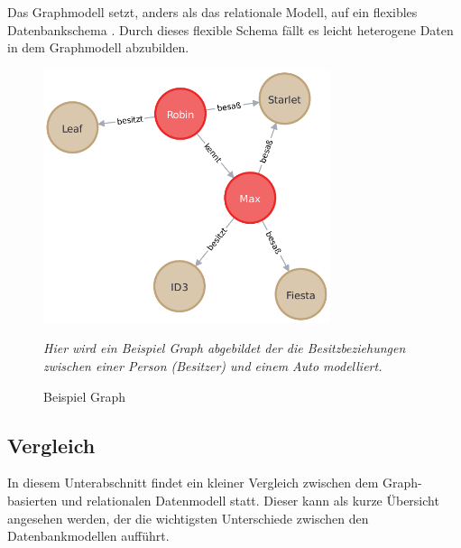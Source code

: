 Das Graphmodell setzt, anders als das relationale Modell, auf ein flexibles Datenbankschema \cite{gdbms}. Durch dieses flexible Schema fällt es leicht heterogene Daten in dem Graphmodell abzubilden. 

\begin{figure}[ht]
    \centering
    \includegraphics[width=0.75\textwidth]{images/example_graph.pdf}
    \caption{Beispiel Graph}
    \vspace{1em}
    \textit{Hier wird ein Beispiel Graph abgebildet der die Besitzbeziehungen zwischen einer Person (Besitzer) und einem Auto modelliert.}
    \label{fig:beispiel_graph}
\end{figure}

\subsection{Vergleich}
In diesem Unterabschnitt findet ein kleiner Vergleich zwischen dem Graph-basierten und relationalen Datenmodell statt. Dieser kann als kurze Übersicht angesehen werden, der die wichtigsten Unterschiede zwischen den Datenbankmodellen aufführt. 

